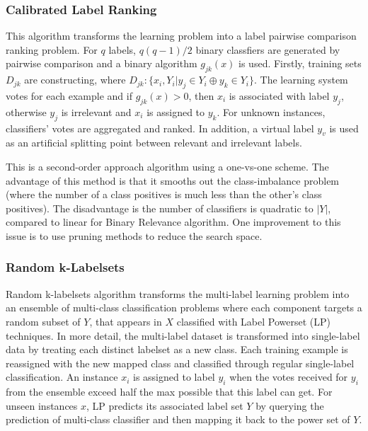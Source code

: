 \documentclass[12pt]{report}
\begin{document}
	\subsubsection*{Calibrated Label Ranking}
	This algorithm transforms the learning problem into a label pairwise comparison ranking problem. For $q$ labels, $q(q-1)/2$ binary classfiers are generated by pairwise comparison and a binary algorithm $g_{jk}(x)$ is used. Firstly, training sets $D_{jk}$ are constructing, where $D_{jk}: \{x_i, Y_i | y_j \in Y_i \oplus y_k \in Y_i\}$. The learning system votes for each example and if $g_{jk}(x)>0$, then $x_i$ is associated with label $y_j$, otherwise $y_j$ is irrelevant and $x_i$ is assigned to $y_k$. For unknown instances, classifiers' votes are aggregated and ranked. In addition, a virtual label $y_v$ is used as an artificial splitting point between relevant and irrelevant labels.
	
	This is a second-order approach algorithm using a one-vs-one scheme. The advantage of this method is that it smooths out the class-imbalance problem (where the number of a class positives is much less than the other's class positives). The disadvantage is the number of classifiers is quadratic to $|Y|$, compared to linear for Binary Relevance algorithm. One improvement to this issue is to use pruning methods to reduce the search space.
	
	\subsubsection*{Random k-Labelsets}
	Random k-labelsets algorithm transforms the multi-label learning problem into an ensemble of multi-class classification problems where each component targets a random subset of $Y$, that appears in $X$ classified with Label Powerset (LP) techniques. In more detail, the multi-label dataset is transformed into single-label data by treating each distinct labelset as a new class. Each training example is reassigned with the new mapped class and classified through regular single-label classification. An instance $x_i$ is assigned to label $y_i$ when the votes received for $y_i$ from the ensemble exceed half the max possible that this label can get. For unseen instances $x$, LP predicts its associated label set $Y$ by querying the prediction of multi-class classifier and then mapping it back to the power set of $Y$.
	
\end{document}

